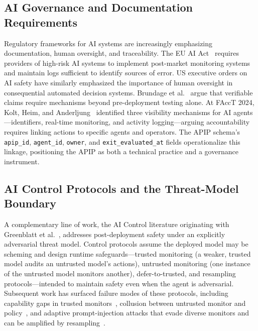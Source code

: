 \subsection{AI Governance and Documentation Requirements}
\label{subsec:governance}

Regulatory frameworks for AI systems are increasingly emphasizing
documentation, human oversight, and traceability. The EU AI
Act~\cite{eu2024aiact} requires providers of high-risk AI systems to implement
post-market monitoring systems and maintain logs sufficient to identify sources
of error. US executive orders on AI safety have similarly emphasized the
importance of human oversight in consequential automated decision systems.
Brundage et al.~\cite{brundage2020trustworthy} argue that verifiable claims
require mechanisms beyond pre-deployment testing alone. At FAccT 2024, Kolt,
Heim, and Anderljung~\cite{kolt2024visibility} identified three visibility
mechanisms for AI agents---identifiers, real-time monitoring, and activity
logging---arguing accountability requires linking actions to specific agents and
operators. The APIP schema's \texttt{apip\_id}, \texttt{agent\_id},
\texttt{owner}, and \texttt{exit\_evaluated\_at} fields operationalize this
linkage, positioning the APIP as both a technical practice and a governance
instrument.

\subsection{AI Control Protocols and the Threat-Model Boundary}
\label{subsec:ai-control}

A complementary line of work, the AI Control literature originating with
Greenblatt et al.~\cite{greenblatt2023control}, addresses post-deployment
safety under an explicitly adversarial threat model. Control protocols assume
the deployed model may be scheming and design runtime safeguards---trusted
monitoring (a weaker, trusted model audits an untrusted model's actions),
untrusted monitoring (one instance of the untrusted model monitors another),
defer-to-trusted, and resampling protocols---intended to maintain safety even
when the agent is adversarial. Subsequent work has surfaced failure modes of
these protocols, including capability gaps in trusted
monitors~\cite{bhatt2025ctrlz}, collusion between untrusted monitor and
policy~\cite{mallen2025subversion}, and adaptive prompt-injection attacks that
evade diverse monitors and can be amplified by
resampling~\cite{schoen2025stress}.

